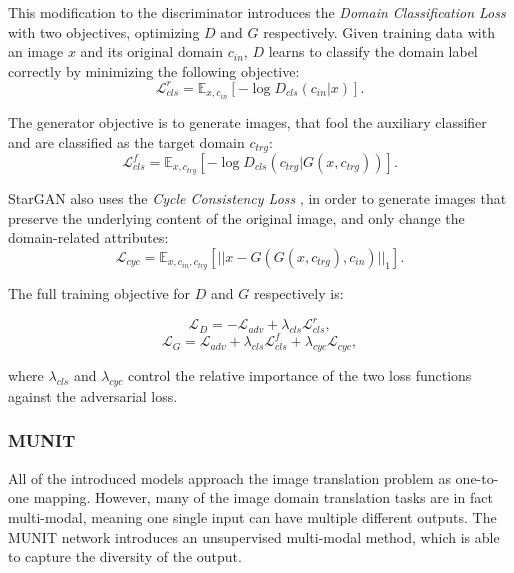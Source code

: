 \documentclass{article}
\begin{document}
This modification to the discriminator introduces the \textit{Domain Classification Loss} with two objectives, optimizing $D$ and $G$ respectively. Given training data with an image $x$ and its original domain $c_{in}$, $D$ learns to classify the domain label correctly by minimizing the following objective:
\begin{equation}
\mathcal{L}^{r}_{cls} = \mathbb{E}_{x,c_{in}}[-\log D_{cls}(c_{in}|x)].
\label{eq:stargan_clsr}
\end{equation}

The generator objective is to generate images, that fool the auxiliary classifier and are classified as the target domain $c_{trg}$:
\begin{equation}
\mathcal{L}^{f}_{cls} = \mathbb{E}_{x,c_{trg}}[-\log D_{cls}(c_{trg}|G(x, c_{trg}))].
\label{eq:stargan_clsf}
\end{equation}

StarGAN \cite{choi_stargan:_2017} also uses the \textit{Cycle Consistency Loss} \cite{zhu_unpaired_2017}, in order to generate images that preserve the underlying content of the original image, and only change the domain-related attributes:
\begin{equation}
\mathcal{L}_{cyc} = \mathbb{E}_{x,c_{in},c_{trg}}[||x - G(G(x,c_{trg}), c_{in})||_{1}].
\label{eq:stargan_cyc}
\end{equation}


The full training objective for $D$ and $G$ respectively is:

\begin{equation}
\mathcal{L}_{D} = -\mathcal{L}_{adv} + \lambda_{cls} \mathcal{L}^{r}_{cls},
\label{eq:stargan_D}
\end{equation}
\begin{equation}
\mathcal{L}_{G} = \mathcal{L}_{adv} + \lambda_{cls} \mathcal{L}^{f}_{cls} + \lambda_{cyc} \mathcal{L}_{cyc},
\label{eq:stargan_G}
\end{equation}

where $\lambda_{cls}$ and $\lambda_{cyc}$ control the relative importance of the two loss functions against the adversarial loss.

\subsubsection{MUNIT}
All of the introduced models approach the image translation problem as one-to-one mapping. However, many of the image domain translation tasks are in fact multi-modal, meaning one single input can have multiple different outputs. The MUNIT network \cite{huang_multimodal_2018} introduces an unsupervised multi-modal method, which is able to capture the diversity of the output.
\end{document}
